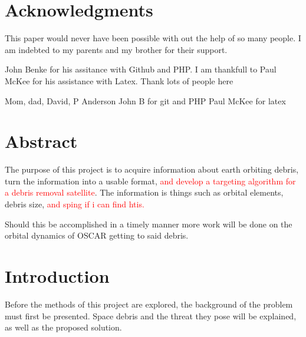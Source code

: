 \documentclass[12pt]{article}
\begin{document}
	\newpage
		\doublespacing
	\section{Acknowledgments}
	
	This paper would never have been possible with out the help of so many people. 
	I am indebted to my parents and my brother for their support. 
	
	John Benke for his assitance with Github and PHP. I am thankfull to Paul McKee for his assistance with Latex. 
	Thank lots of people here\par 
	
	Mom, dad, David,
	P Anderson
	John B for git and PHP
	Paul McKee for latex 
	
	
	
	

	
	
	\newpage
	\section{Abstract}
	The purpose of this project is to acquire information about earth orbiting debris, turn the information into a usable format, \textcolor{red}{and develop a targeting algorithm for a debris removal satellite}. The information is things such as orbital elements, debris size, \textcolor{red}{ and sping if i can find htis.} \par 
	 Should this be accomplished in a timely manner more work will be done on the orbital dynamics of OSCAR getting to said debris.
	\newpage
	\section{Introduction}
	Before the methods of this project are explored, the background of the problem must first be presented. Space debris and the threat they pose will be explained, as well as the proposed solution. 
	
\end{document}

